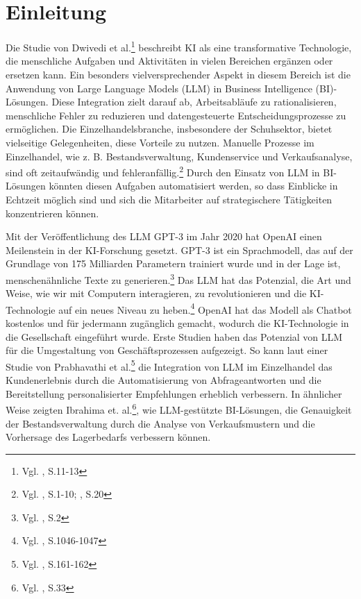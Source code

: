 

\section{Einleitung} 
\label{sec:einleitung}

Die Studie von Dwivedi et al.\footnote{Vgl. \cite{DwivediHughes2021}, S.11-13} beschreibt KI als eine transformative Technologie, die menschliche Aufgaben und Aktivitäten in vielen Bereichen ergänzen oder ersetzen kann. Ein besonders vielversprechender Aspekt in diesem Bereich ist die Anwendung von Large Language Models (LLM) in Business Intelligence (BI)-Lösungen. Diese Integration zielt darauf ab, Arbeitsabläufe zu rationalisieren, menschliche Fehler zu reduzieren und datengesteuerte Entscheidungsprozesse zu ermöglichen. 
Die Einzelhandelsbranche, insbesondere der Schuhsektor, bietet vielseitige Gelegenheiten, diese Vorteile zu nutzen. Manuelle Prozesse im Einzelhandel, wie z. B. Bestandsverwaltung, Kundenservice und Verkaufsanalyse, sind oft zeitaufwändig und fehleranfällig.\footnote{Vgl. \cite{Perez2018}, S.1-10; \cite{Lee2018}, S.20} Durch den Einsatz von LLM in BI-Lösungen könnten diesen Aufgaben automatisiert werden, so dass Einblicke in Echtzeit möglich sind und sich die Mitarbeiter auf strategischere Tätigkeiten konzentrieren können.


Mit der Veröffentlichung des LLM GPT-3 im Jahr 2020 hat OpenAI einen Meilenstein in der KI-Forschung gesetzt. GPT-3 ist ein Sprachmodell, das auf der Grundlage von 175 Milliarden Parametern trainiert wurde und in der Lage ist, menschenähnliche Texte zu generieren.\footnote{Vgl. \cite{Brown2020}, S.2} Das LLM hat das Potenzial, die Art und Weise, wie wir mit Computern interagieren, zu revolutionieren und die KI-Technologie auf ein neues Niveau zu heben.\footnote{Vgl. \cite{Lu2021}, S.1046-1047} OpenAI hat das Modell als Chatbot kostenlos und für jedermann zugänglich gemacht, wodurch die KI-Technologie in die Gesellschaft eingeführt wurde. Erste Studien haben das Potenzial von LLM für die Umgestaltung von Geschäftsprozessen aufgezeigt. So kann laut einer Studie von Prabhavathi et al.\footnote{Vgl. \cite{Prabhavathi2019}, S.161-162} die Integration von LLM im Einzelhandel das Kundenerlebnis durch die Automatisierung von Abfrageantworten und die Bereitstellung personalisierter Empfehlungen erheblich verbessern. In ähnlicher Weise zeigten Ibrahima et. al.\footnote{Vgl. \cite{Ibrahima2021}, S.33}, wie LLM-gestützte BI-Lösungen, die Genauigkeit der Bestandsverwaltung durch die Analyse von Verkaufsmustern und die Vorhersage des Lagerbedarfs verbessern können.

